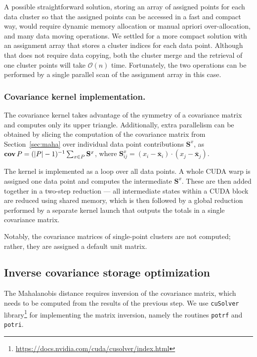 A possible straightforward solution, storing an array of assigned points for each data cluster so that the assigned points can be accessed in a fast and compact way, would require dynamic memory allocation or manual apriori over-allocation, and many data moving operations.
We settled for a more compact solution with an assignment array that stores a cluster indices for each data point.
Although that does not require data copying, both the cluster merge and the retrieval of one cluster points will take $\mathcal{O}(n)$ time.
Fortunately, the two operations can be performed by a single parallel scan of the assignment array in this case.

\subsubsection{Covariance kernel implementation.}

The covariance kernel takes advantage of the symmetry of a covariance matrix and computes only its upper triangle.
Additionally, extra parallelism can be obtained by slicing the computation of the covariance matrix from Section~\ref{sec:maha} over individual data point contributions $\mathbf{S}^x$, as
$\operatorname{\textbf{cov}} P = (|P|-1)^{-1}\sum_{x\in P}\mathbf{S}^x$, where
$\mathbf{S}^x_{ij}=(x_i-\mathbf{\bar{x}}_i)\cdot(x_j-\mathbf{\bar{x}}_j)$.

The kernel is implemented as a loop over all data points.
A whole CUDA warp is assigned one data point and computes the intermediate $\mathbf{S}^x$.
These are then added together in a two-step reduction --- all intermediate states within a CUDA block are reduced using shared memory, which is then followed by a global reduction performed by a separate kernel launch that outputs the totals in a single covariance matrix.

Notably, the covariance matrices of single-point clusters are not computed; rather, they are assigned a default unit matrix.

\subsection{Inverse covariance storage optimization}
\label{subsec:icov}

The Mahalanobis distance requires inversion of the covariance matrix, which needs to be computed from the results of the previous step.
We use \texttt{cuSolver} library\footnote{\url{https://docs.nvidia.com/cuda/cusolver/index.html}} for implementing the matrix inversion, namely the routines \texttt{potrf} and \texttt{potri}.

